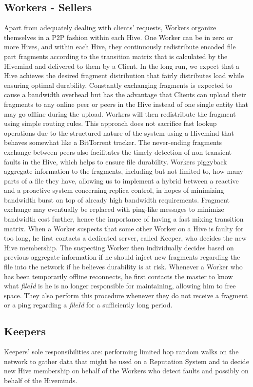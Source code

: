 \documentclass[runningheads]{llncs}
\begin{document}
\subsection{Workers - Sellers}
Apart from adequately dealing with clients' requests, Workers organize themselves in a P2P fashion within each Hive. One Worker can be in zero or more Hives, and within each Hive, they continuously redistribute encoded file part fragments according to the transition matrix that is calculated by the Hivemind and delivered to them by a Client. In the long run, we expect that a Hive achieves the desired fragment distribution that fairly distributes load while ensuring optimal durability. Constantly exchanging fragments is expected to cause a bandwidth overhead but has the advantage that Clients can upload their fragments to any online peer or peers in the Hive instead of one single entity that may go offline during the upload. Workers will then redistribute the fragment using simple routing rules. This approach does not sacrifice fast lookup operations due to the structured nature of the system using a Hivemind that behaves somewhat like a BitTorrent\cite{bittorrent} tracker. The never-ending fragments exchange between peers also facilitates the timely detection of non-transient faults in the Hive, which helps to ensure file durability. Workers piggyback aggregate information to the fragments, including but not limited to, how many parts of a file they have, allowing us to implement a hybrid between a reactive and a proactive system concerning replica control, in hopes of minimizing bandwidth burst on top of already high bandwidth requirements. Fragment exchange may eventually be replaced with ping-like messages to minimize bandwidth cost further, hence the importance of having a fast mixing transition matrix. When a Worker suspects that some other Worker on a Hive is faulty for too long, he first contacts a dedicated server, called Keeper, who decides the new Hive membership. The suspecting Worker then individually decides based on previous aggregate information if he should inject new fragments regarding the file into the network if he believes durability is at risk. Whenever a Worker who has been temporarily offline reconnects, he first contacts the master to know what \textit{fileId} is he is no longer responsible for maintaining, allowing him to free space. They also perform this procedure whenever they do not receive a fragment or a ping regarding a \textit{fileId} for a sufficiently long period.

\subsection{Keepers}
Keepers' sole responsibilities are: performing limited hop random walks on the network to gather data that might be used on a Reputation System and to decide new Hive membership on behalf of the Workers who detect faults and possibly on behalf of the Hiveminds.
\end{document}
